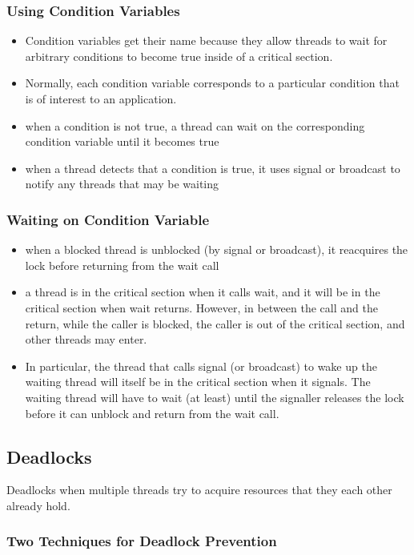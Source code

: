 \documentclass[twoside]{article}
\begin{document}
\subsubsection{Using Condition Variables}
\begin{itemize}
\item Condition variables get their name because they allow threads to wait for arbitrary conditions to become true inside of a critical section.
\item Normally, each condition variable corresponds to a particular condition that is of interest to an application.
\item when a condition is not true, a thread can wait on the corresponding condition variable until it becomes true
\item when a thread detects that a condition is true, it uses signal or broadcast to notify any threads that may be waiting
\end{itemize}

\subsubsection{Waiting on Condition Variable}
\begin{itemize}
\item when a blocked thread is unblocked (by signal or broadcast), it reacquires the lock before returning from the wait call
\item a thread is in the critical section when it calls wait, and it will be in the critical section when wait returns. However, in between the call and the return, while the caller is blocked, the caller is out of the critical section, and other threads may enter.
\item In particular, the thread that calls signal (or broadcast) to wake up the waiting thread will itself be in the critical section when it signals. The waiting thread will have to wait (at least) until the signaller releases the lock before it can unblock and return from the wait call.
\end{itemize}

\subsection{Deadlocks}
Deadlocks when multiple threads try to acquire resources that they each other already hold. 

\subsubsection{Two Techniques for Deadlock Prevention}
\end{document}
